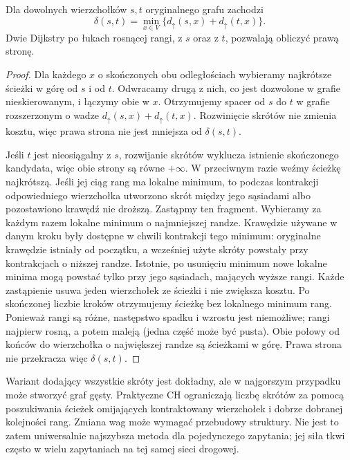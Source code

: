 \begin{twierdzenie}
\label{thm:tg-weighted-ch-query}
Dla dowolnych wierzchołków
$s,t$ oryginalnego
grafu zachodzi
\[
\delta(s,t)=
\min_{x\in V}
\{d_\uparrow(s,x)+d_\uparrow(t,x)\}.
\]
Dwie Dijkstry po
łukach rosnącej rangi,
z $s$ oraz z $t$,
pozwalają obliczyć
prawą stronę.
\end{twierdzenie}
\begin{proof}
Dla każdego $x$ o skończonych obu odległościach
wybieramy najkrótsze ścieżki w górę od $s$ i od $t$.
Odwracamy drugą z nich, co jest dozwolone w grafie
nieskierowanym, i łączymy obie w $x$.
Otrzymujemy spacer od $s$ do $t$ w grafie rozszerzonym
o wadze $d_\uparrow(s,x)+d_\uparrow(t,x)$.
Rozwinięcie skrótów
nie zmienia kosztu,
więc prawa strona
nie jest mniejsza
od $\delta(s,t)$.

Jeśli $t$ jest nieosiągalny z $s$, rozwijanie skrótów
wyklucza istnienie skończonego kandydata, więc obie
strony są równe $+\infty$. W przeciwnym razie
weźmy ścieżkę najkrótszą.
Jeśli jej ciąg rang
ma lokalne minimum,
to podczas kontrakcji
odpowiedniego wierzchołka
utworzono skrót między
jego sąsiadami albo
pozostawiono krawędź
nie droższą.
Zastąpmy ten fragment.
Wybieramy za każdym razem lokalne minimum o najmniejszej
randze. Krawędzie używane w danym kroku były dostępne
w chwili kontrakcji tego minimum: oryginalne krawędzie
istniały od początku, a wcześniej użyte skróty powstały
przy kontrakcjach o niższej randze. Istotnie, po usunięciu
minimum nowe lokalne minima mogą powstać tylko przy jego
sąsiadach, mających wyższe rangi. Każde zastąpienie usuwa
jeden wierzchołek ze ścieżki i nie zwiększa kosztu.
Po skończonej liczbie kroków otrzymujemy ścieżkę bez
lokalnego minimum rang. Ponieważ rangi są różne,
następstwo spadku i wzrostu jest niemożliwe; rangi
najpierw rosną, a potem maleją (jedna część może być pusta).
Obie połowy od końców
do wierzchołka
o największej randze
są ścieżkami w górę.
Prawa strona nie
przekracza więc
$\delta(s,t)$.
\end{proof}

\begin{uwaga}
Wariant dodający wszystkie
skróty jest dokładny, ale
w najgorszym przypadku
może stworzyć graf gęsty.
Praktyczne CH ograniczają
liczbę skrótów za pomocą
poszukiwania ścieżek
omijających kontraktowany
wierzchołek i dobrze
dobranej kolejności rang.
Zmiana wag może wymagać
przebudowy struktury.
Nie jest to zatem
uniwersalnie najszybsza
metoda dla pojedynczego
zapytania; jej siła
tkwi często w wielu
zapytaniach na
tej samej sieci drogowej.
\end{uwaga}

